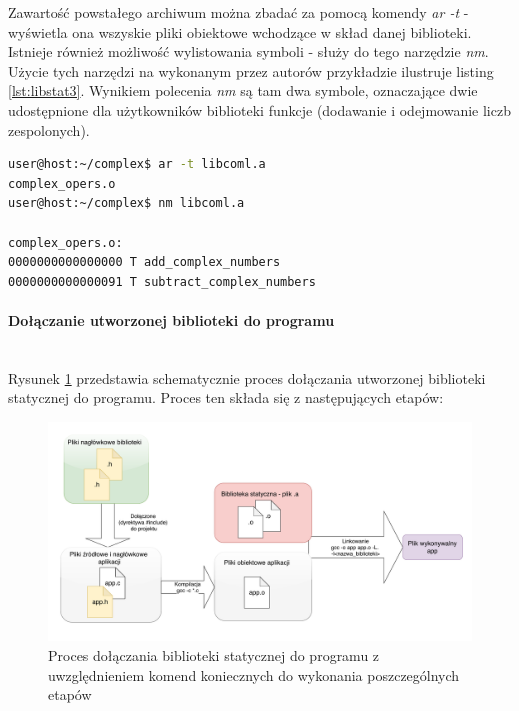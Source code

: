 Zawartość powstałego archiwum można zbadać za pomocą komendy \textit{ar -t} - wyświetla ona wszyskie pliki obiektowe wchodzące w skład danej biblioteki. Istnieje również możliwość wylistowania symboli - służy do tego narzędzie \textit{nm}. Użycie tych narzędzi na wykonanym przez autorów przykładzie ilustruje listing \ref{lst:libstat3}. Wynikiem polecenia \textit{nm} są tam dwa symbole, oznaczające dwie udostępnione dla użytkowników biblioteki funkcje (dodawanie i odejmowanie liczb zespolonych).

\begin{lstlisting}[language=bash, caption={Użycie poleceń \textit{ar -t} oraz \textit{nm} na bibliotece statycznej.},label={lst:libstat3}]
user@host:~/complex$ ar -t libcoml.a
complex_opers.o
user@host:~/complex$ nm libcoml.a

complex_opers.o:
0000000000000000 T add_complex_numbers
0000000000000091 T subtract_complex_numbers
\end{lstlisting}


\paragraph*{Dołączanie utworzonej biblioteki do programu}\mbox{}\\
Rysunek \ref{fig:staticliblink} przedstawia schematycznie proces dołączania utworzonej biblioteki statycznej do programu. Proces ten składa się z następujących etapów:

\begin{figure}[H]
\centering
\caption{Proces dołączania biblioteki statycznej do programu z uwzględnieniem komend koniecznych do wykonania poszczególnych etapów}
\label{fig:staticliblink}
\includegraphics[width=\textwidth]{res/StaticLibLink}
\end{figure}

